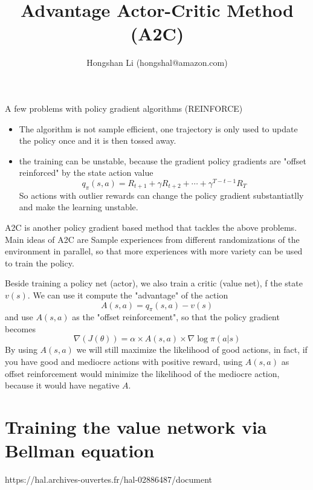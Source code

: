 \documentclass{article}
\title{Advantage Actor-Critic Method (A2C)}
\author{Hongshan Li (hongshal@amazon.com)}
\begin{document}
\maketitle

A few problems with policy gradient algorithms (REINFORCE)
\begin{itemize}
    \item The algorithm is not sample efficient, one trajectory
        is only used to update the policy once and it is then
        tossed away.
    \item the training can be unstable, because the gradient 
        policy gradients are "offset reinforced" by the
        state action value 
        \[
            q_{\pi}(s, a) = R_{t+1} + \gamma R_{t+2} + \cdots + 
                \gamma^{T-t-1}R_T
        \]
        So actions with outlier rewards can change the policy gradient
        substantiatlly and make the learning unstable. 
\end{itemize}

    
A2C is another policy gradient based method that tackles the above problems. 
Main ideas of A2C are
Sample experiences from different randomizations of the environment 
in parallel, so that more experiences with more variety can be used 
to train the policy. 

Beside training a policy net (actor), we also train a critic (value net),
f the state $v(s)$. We can use it compute the 
"advantage" of the action
\[
  A(s, a) = q_{\pi}(s, a) - v(s)
\]
and use $A(s, a)$ as the "offset reinforcement", so that the policy gradient 
becomes
\[
  \nabla(J(\theta)) = \alpha \times A(s, a) \times \nabla\log\pi(a|s)
\]
By using $A(s, a)$ we will still maximize the likelihood of good actions,
in fact, if you have good and mediocre actions with positive reward, 
using $A(s, a)$ as offset reinforcement would minimize the likelihood
of the mediocre action, because it would have negative $A$. 

\section{Training the value network via Bellman equation}


https://hal.archives-ouvertes.fr/hal-02886487/document
\end{document}
